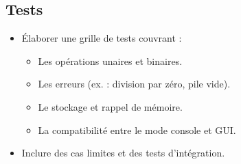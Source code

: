 \documentclass[12pt]{report}
\begin{document}
            \subsection*{Tests}
                \begin{itemize}
                    \item Élaborer une grille de tests couvrant :
                    \begin{itemize}
                        \item Les opérations unaires et binaires.
                        \item Les erreurs (ex. : division par zéro, pile vide).
                        \item Le stockage et rappel de mémoire.
                        \item La compatibilité entre le mode console et GUI.
                    \end{itemize}

                    \item Inclure des cas limites et des tests d'intégration.
                \end{itemize}

\end{document}
